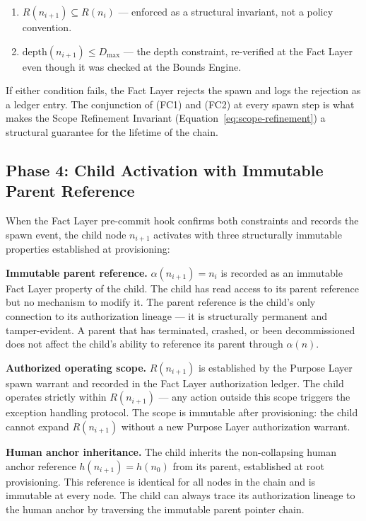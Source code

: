 \begin{enumerate}
    \item[(FC1)] $R(n_{i+1}) \subseteq R(n_i)$ — enforced as a structural invariant, not a policy convention.
    \item[(FC2)] $\text{depth}(n_{i+1}) \leq D_{\max}$ — the depth constraint, re-verified at the Fact Layer even though it was checked at the Bounds Engine.
\end{enumerate}

If either condition fails, the Fact Layer rejects the spawn and logs the rejection as a ledger entry. The conjunction of (FC1) and (FC2) at every spawn step is what makes the Scope Refinement Invariant (Equation~\ref{eq:scope-refinement}) a structural guarantee for the lifetime of the chain.

\subsection{Phase 4: Child Activation with Immutable Parent Reference}
\label{sec:rs-child-activation}

When the Fact Layer pre-commit hook confirms both constraints and records the spawn event, the child node $n_{i+1}$ activates with three structurally immutable properties established at provisioning:

\medskip
\noindent\textbf{Immutable parent reference.} $\alpha(n_{i+1}) = n_i$ is recorded as an immutable Fact Layer property of the child. The child has read access to its parent reference but no mechanism to modify it. The parent reference is the child's only connection to its authorization lineage — it is structurally permanent and tamper-evident. A parent that has terminated, crashed, or been decommissioned does not affect the child's ability to reference its parent through $\alpha(n)$.

\medskip
\noindent\textbf{Authorized operating scope.} $R(n_{i+1})$ is established by the Purpose Layer spawn warrant and recorded in the Fact Layer authorization ledger. The child operates strictly within $R(n_{i+1})$ — any action outside this scope triggers the exception handling protocol. The scope is immutable after provisioning: the child cannot expand $R(n_{i+1})$ without a new Purpose Layer authorization warrant.

\medskip
\noindent\textbf{Human anchor inheritance.} The child inherits the non-collapsing human anchor reference $h(n_{i+1}) = h(n_0)$ from its parent, established at root provisioning. This reference is identical for all nodes in the chain and is immutable at every node. The child can always trace its authorization lineage to the human anchor by traversing the immutable parent pointer chain.

